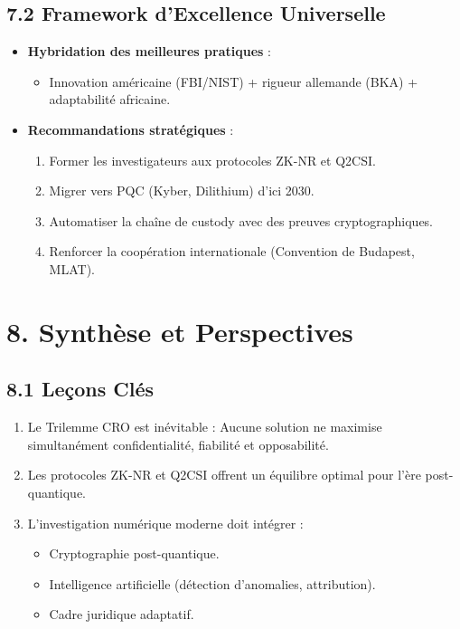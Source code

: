\documentclass[12pt, a4paper]{report}
\begin{document}
\subsection*{7.2 Framework d’Excellence Universelle}
\begin{itemize}
    \item \textbf{Hybridation des meilleures pratiques} :
    \begin{itemize}
        \item Innovation américaine (FBI/NIST) + rigueur allemande (BKA) + adaptabilité africaine.
    \end{itemize}
    \item \textbf{Recommandations stratégiques} :
    \begin{enumerate}
        \item Former les investigateurs aux protocoles ZK-NR et Q2CSI.
        \item Migrer vers PQC (Kyber, Dilithium) d’ici 2030.
        \item Automatiser la chaîne de custody avec des preuves cryptographiques.
        \item Renforcer la coopération internationale (Convention de Budapest, MLAT).
    \end{enumerate}
\end{itemize}

\section*{8. Synthèse et Perspectives}
\subsection*{8.1 Leçons Clés}
\begin{enumerate}
    \item Le Trilemme CRO est inévitable : Aucune solution ne maximise simultanément confidentialité, fiabilité et opposabilité.
    \item Les protocoles ZK-NR et Q2CSI offrent un équilibre optimal pour l’ère post-quantique.
    \item L’investigation numérique moderne doit intégrer :
    \begin{itemize}
        \item Cryptographie post-quantique.
        \item Intelligence artificielle (détection d’anomalies, attribution).
        \item Cadre juridique adaptatif.
    \end{itemize}
\end{enumerate}
\end{document}
